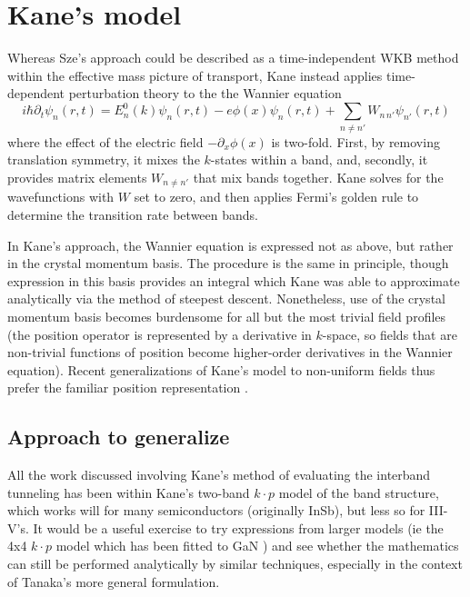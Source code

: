 \section{Kane's model}
Whereas Sze's approach could be described as a time-independent WKB method within the effective mass picture of transport, Kane instead applies time-dependent perturbation theory to the the Wannier equation
$$i\hbar\partial_t\psi_n(r,t)=E_n^0(k)\psi_n(r,t)-e\phi(x)\psi_n(r,t)+\sum_{n\neq n'} W_{n\,n'}\psi_{n'}(r,t)$$
where the effect of the electric field $-\partial_x\phi(x)$ is two-fold.  First, by removing translation symmetry, it mixes the $k$-states within a band, and, secondly, it provides matrix elements $W_{n\neq n'}$ that mix bands together.  Kane solves for the wavefunctions with $W$ set to zero, and then applies Fermi's golden rule to determine the transition rate between bands.

In Kane's approach, the Wannier equation is expressed not as above, but rather in the crystal momentum basis.  The procedure is the same in principle, though expression in this basis provides an integral which Kane was able to approximate analytically via the method of steepest descent.  Nonetheless, use of the crystal momentum basis becomes burdensome for all but the most trivial field profiles (the position operator is represented by a derivative in $k$-space, so fields that are non-trivial functions of position become higher-order derivatives in the Wannier equation).  Recent generalizations of Kane's model to non-uniform fields thus prefer the familiar position representation \cite{Tanaka_1994}.

\subsection{Approach to generalize}
All the work discussed involving Kane's method of evaluating the interband tunneling has been within Kane's two-band $k\cdot p$ model of the band structure, which works will for many semiconductors (originally InSb), but less so for III-V's.  It would be a useful exercise to try expressions from larger models (ie the 4x4 $k\cdot p$ model which has been fitted to GaN \cite{Rinke_2008}) and see whether the mathematics can still be performed analytically by similar techniques, especially  in the context of Tanaka's more general formulation.
